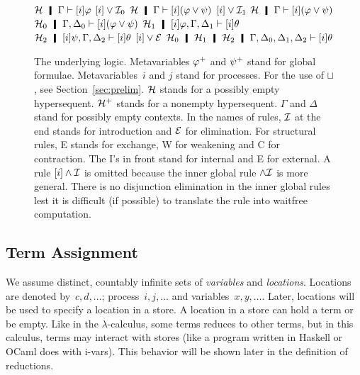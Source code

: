 \begin{figure}
  \UnaryRule
   {$\hyper\hmid\Gamma\vdash[i]\varphi$}
   {$[i]\vee\mathcal I_0$}
   {$\hyper\hmid\Gamma\vdash[i](\varphi\vee\psi)$}
   \hfill
  \UnaryRule{$\hyper\hmid\Gamma\vdash[i]\psi$}
   {$[i]\vee\mathcal I_1$}
   {$\hyper\hmid\Gamma\vdash[i](\varphi\vee\psi)$}
   \TrinaryRule
   {$\hyper_0\hmid\G,\D_0\vdash[i](\phi\vee\psi)$}
   {$\hyper_1\hmid[i]\varphi, \G,\D_1\vdash[i]\theta$}
   {$\hyper_2\hmid[i]\psi,    \G,\D_2\vdash[i]\theta$}
   {$[i]\vee\mathcal E$}
   {$\hyper_0\hmid\hyper_1\hmid\hyper_2\hmid
 \G,\D_0,\D_1,\D_2\vdash[i]\theta$}
\caption[The underlying logic of \lgd.]
 {The underlying logic.
 Metavariables ${\varphi}^+$ and ${\psi}^+$ stand for global formulae.
 Metavariables~$i$ and $j$ stand for processes.  For the use of
 $\sqcup$, see Section~\ref{sec:prelim}.
 $\mathcal{H}$ stands for a possibly empty hypersequent.
 $\mathcal{H}^+$ stands for a nonempty hypersequent.
 $\Gamma$ and $\Delta$ stand for possibly empty contexts.
 In the names of rules, $\mathcal I$ at the end stands for introduction and $\mathcal E$ for
 elimination.  For structural rules, E stands for exchange, W for
 weakening and C for contraction.  The I's in front stand for internal and E
 for external.
 A rule $[i]\wedge\mathcal I$ is omitted because the inner global rule
 $\wedge\mathcal I$ is more general.
  There is no disjunction elimination in the inner global rules lest it
 is difficult (if possible) to translate the rule into
 waitfree computation.
 }
\label{fig:logic}
\end{figure}

\subsection{Term Assignment}
\label{term}

We assume distinct, countably infinite sets of
\textit{variables} and
\textit{locations}.
Locations are denoted by~$c,d,\ldots$; process~$i,j, \ldots$ and variables~$x,
y, \ldots$.
Later, locations will be used to specify a location in a store.
A location in a store can hold a term or be empty.
Like in the $\lambda$-calculus, some terms reduces to other
terms, but in this calculus, terms may interact with stores (like
a program written in Haskell or OCaml does with i-vars).
This behavior will be shown later in the definition of reductions.

